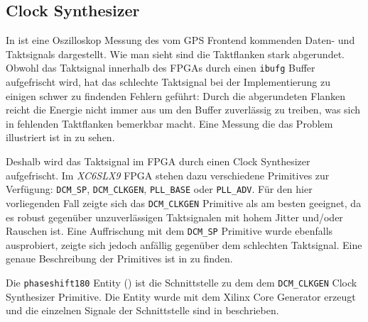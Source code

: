 \subsection{Clock Synthesizer}
In  ist eine Oszilloskop Messung des vom GPS Frontend kommenden Daten- und Taktsignals dargestellt. Wie man sieht sind die Taktflanken stark abgerundet. Obwohl das Taktsignal innerhalb des FPGAs durch einen \lstinline$ibufg$ Buffer aufgefrischt wird, hat das schlechte Taktsignal bei der Implementierung zu einigen schwer zu findenden Fehlern geführt: Durch die abgerundeten Flanken reicht die Energie nicht immer aus um den Buffer zuverlässig zu treiben, was sich in fehlenden Taktflanken bemerkbar macht. Eine Messung die das Problem illustriert ist in  zu sehen.

Deshalb wird das Taktsignal im FPGA durch einen Clock Synthesizer aufgefrischt. Im \emph{XC6SLX9} FPGA stehen dazu verschiedene \glspl{Primitive} zur Verfügung: \lstinline$DCM_SP$, \lstinline$DCM_CLKGEN$, \lstinline$PLL_BASE$ oder \lstinline$PLL_ADV$. Für den hier vorliegenden Fall zeigte sich das \lstinline$DCM_CLKGEN$ \gls{Primitive} als am besten geeignet, da es robust gegenüber unzuverlässigen Taktsignalen mit hohem Jitter und/oder Rauschen ist. Eine Auffrischung mit dem \lstinline$DCM_SP$ \gls{Primitive} wurde ebenfalls ausprobiert, zeigte sich jedoch anfällig gegenüber dem schlechten Taktsignal. Eine genaue Beschreibung der \glspl{Primitive} ist in \cite{SP6Clock} zu finden.



Die \lstinline$phaseshift180$ Entity () ist die Schnittstelle zu dem dem \lstinline$DCM_CLKGEN$  Clock Synthesizer \gls{Primitive}. Die Entity wurde mit dem Xilinx Core Generator erzeugt und die einzelnen Signale der Schnittstelle sind in  beschrieben.

